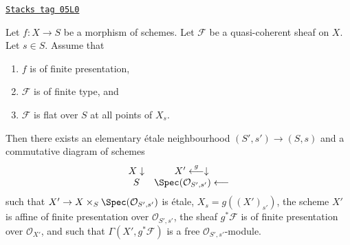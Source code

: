 \begin{lemma}
\label{flat-lemma-finite-type-flat-along-fibre-free}
\href{https://stacks.math.columbia.edu/tag/05L0}{\texttt{Stacks tag 05L0}}

Let $f : X \to S$ be a morphism of schemes.
Let $\mathcal{F}$ be a quasi-coherent sheaf on $X$.
Let $s \in S$.
Assume that
\begin{enumerate}
\item $f$ is of finite presentation,
\item $\mathcal{F}$ is of finite type, and
\item $\mathcal{F}$ is flat over $S$ at all points of $X_s$.
\end{enumerate}
Then there exists an elementary \'etale neighbourhood $(S', s') \to (S, s)$
and a commutative diagram of schemes
$$
\begin{array}{cc}X \downarrow & X' \overset{g}{\longleftarrow}\downarrow \\ S & \Spec(\mathcal{O}_{S', s'}) \longleftarrow\end{array}
$$
such that $X' \to X \times_S \Spec(\mathcal{O}_{S', s'})$
is \'etale, $X_s = g((X')_{s'})$, the scheme $X'$ is
affine of finite presentation over $\mathcal{O}_{S', s'}$,
the sheaf $g^*\mathcal{F}$ is of finite presentation over $\mathcal{O}_{X'}$,
and such that $\Gamma(X', g^*\mathcal{F})$ is a free
$\mathcal{O}_{S', s'}$-module.
\end{lemma}

